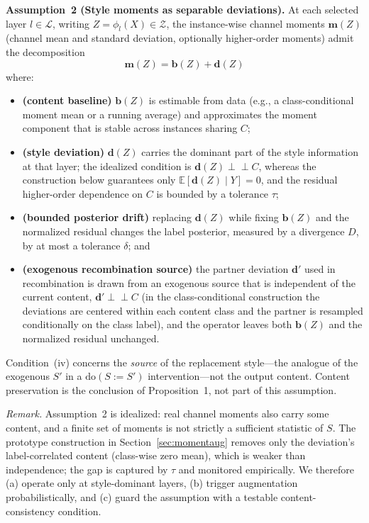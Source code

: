 \documentclass[electronics,article,submit,moreauthors]{Definitions/mdpi}
\begin{document}
\noindent\textbf{Assumption~2 (Style moments as separable deviations).} At each selected layer $l\in\mathcal{L}$, writing $Z=\phi_l(X)\in\mathcal{Z}$, the instance-wise channel moments $\mathbf{m}(Z)$ (channel mean and standard deviation, optionally higher-order moments) admit the decomposition
\begin{equation}
\mathbf{m}(Z)=\mathbf{b}(Z)+\mathbf{d}(Z)
\end{equation}
where:
\begin{itemize}[leftmargin=2.2em,labelwidth=1.8em,labelsep=0.4em,align=left]
\item[(i)] \textbf{(content baseline)} $\mathbf{b}(Z)$ is estimable from data (e.g., a class-conditional moment mean or a running average) and approximates the moment component that is stable across instances sharing $C$;
\item[(ii)] \textbf{(style deviation)} $\mathbf{d}(Z)$ carries the dominant part of the style information at that layer; the idealized condition is $\mathbf{d}(Z)\perp\!\!\!\perp C$, whereas the construction below guarantees only $\mathbb{E}[\mathbf{d}(Z)\mid Y]=0$, and the residual higher-order dependence on $C$ is bounded by a tolerance $\tau$;
\item[(iii)] \textbf{(bounded posterior drift)} replacing $\mathbf{d}(Z)$ while fixing $\mathbf{b}(Z)$ and the normalized residual changes the label posterior, measured by a divergence $D$, by at most a tolerance $\delta$; and
\item[(iv)] \textbf{(exogenous recombination source)} the partner deviation $\mathbf{d}'$ used in recombination is drawn from an exogenous source that is independent of the current content, $\mathbf{d}'\perp\!\!\!\perp C$ (in the class-conditional construction the deviations are centered within each content class and the partner is resampled conditionally on the class label), and the operator leaves both $\mathbf{b}(Z)$ and the normalized residual unchanged.
\end{itemize}
Condition~(iv) concerns the \emph{source} of the replacement style---the analogue of the exogenous $S'$ in a $\mathrm{do}(S\!:=\!S')$ intervention---not the output content. Content preservation is the conclusion of Proposition~1, not part of this assumption.

\textit{Remark.} Assumption~2 is idealized: real channel moments also carry some content, and a finite set of moments is not strictly a sufficient statistic of $S$. The prototype construction in Section~\ref{sec:momentaug} removes only the deviation's label-correlated content (class-wise zero mean), which is weaker than independence; the gap is captured by $\tau$ and monitored empirically. We therefore (a) operate only at style-dominant layers, (b) trigger augmentation probabilistically, and (c) guard the assumption with a testable content-consistency condition.
\end{document}
